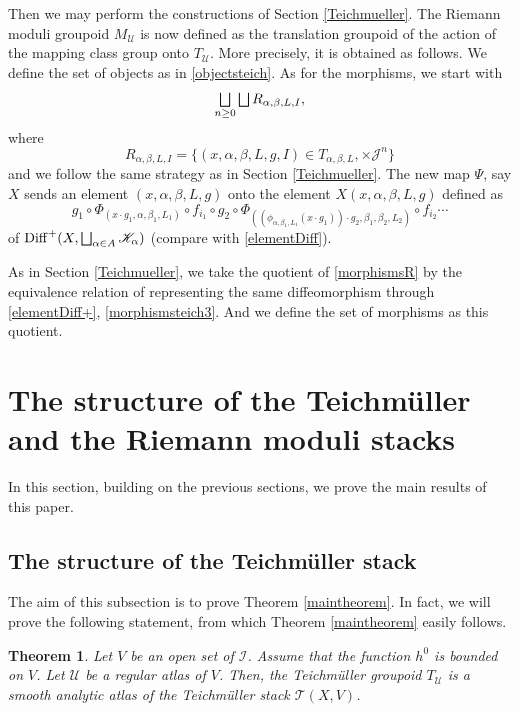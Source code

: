 \documentclass[JEP,XML,SOM,Unicode]{cedram}
\let\mathcal\mathscr
\let\oldbigsqcup\bigsqcup
\renewcommand{\bigsqcup}{\mathop{\textstyle\oldbigsqcup}\displaylimits}
\DeclareMathOperator{\Diff}{Diff}
\theoremstyle{plain}
\newtheorem{theorem}{Theorem}[section]
\theoremstyle{definition}
\theoremstyle{remark}
\numberwithin{equation}{section}
\newcommand{\DKp}{\Diff^+(X,\bigsqcup_{\alpha\in A}\mathcal K_\alpha)}
\newcommand{\cI}{\mathcal{I}}
\let\uniondisjointe\bigsqcup
\begin{document}
Then we may perform the constructions of Section \ref{Teichmueller}. The Riemann moduli groupoid $M_{\mathcal U}$ is now defined
as the translation groupoid of the action of the mapping class group onto $T_{\mathcal U}$. More precisely, it is obtained as follows. We define the set of objects
as in \eqref{objectsteich}. As for the morphisms, we start with
\begin{equation}
\label{morphismsR}
\uniondisjointe_{n\geq 0}\uniondisjointe R_{\alpha,\beta, L, I},
\end{equation}
where
\begin{equation}
\label{R}
R_{\alpha,\beta, L, I}=\{(x,\alpha,\beta,L,g,I)\in T_{\alpha,\beta, L},\times\mathcal J^n\}
\end{equation}
and we follow the same strategy as in Section \ref{Teichmueller}.
The new map $\Psi$, say $X$ sends an element $(x,\alpha,\beta,L,g)$ onto the element $X(x,\alpha,\beta,L,g)$ defined as
\begin{equation}
\label{elementDiff+}
g_1\circ \Phi_{(x\cdot g_1,\alpha,\beta_1, L_1)}\circ f_{i_1}\circ g_2\circ \Phi_{((\phi_{\alpha,\beta_1,L_1}(x\cdot g_1))\cdot g_2,\beta_1,\beta_2, L_2)}\circ f_{i_2}\cdots\end{equation}
of $\DKp$ (compare with \eqref{elementDiff}).

As in Section \ref{Teichmueller}, we take the quotient of \eqref{morphismsR} by the equivalence relation of representing the same diffeomorphism through \eqref{elementDiff+}, \cf \eqref{morphismsteich3}. And we define the set of morphisms as this quotient.

\section{The structure of the Teichmüller and the Riemann moduli stacks}
\label{main}
In this section, building on the previous sections, we prove the main results of this paper.

\subsection{The structure of the Teichmüller stack}
\label{mainTeich}
The aim of this subsection is to prove
Theorem \ref{maintheorem}. In fact, we will prove the following statement, from which Theorem \ref{maintheorem} easily follows.

\begin{theorem}
\label{maintheorembis}
Let $V$ be an open set of $\cI$. Assume that the function $h^0$ is bounded on $V$. Let $\mathcal U$ be a regular atlas of $V$. Then,
the Teichmüller groupoid $T_{\mathcal U}$ is a smooth analytic atlas of the Teichmüller stack $\mathcal T(X,V)$.
\end{theorem}
\end{document}
